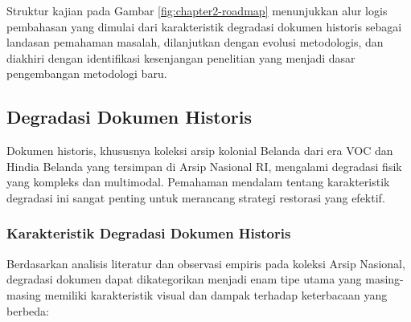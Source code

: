 \documentclass[12pt,a4paper]{article}
\begin{document}
Struktur kajian pada Gambar \ref{fig:chapter2-roadmap} menunjukkan alur logis pembahasan yang dimulai dari karakteristik degradasi dokumen historis sebagai landasan pemahaman masalah, dilanjutkan dengan evolusi metodologis, dan diakhiri dengan identifikasi kesenjangan penelitian yang menjadi dasar pengembangan metodologi baru.

\subsection{Degradasi Dokumen Historis}
\label{subsec:degradasi-dokumen}

Dokumen historis, khususnya koleksi arsip kolonial Belanda dari era VOC dan Hindia Belanda yang tersimpan di Arsip Nasional RI, mengalami degradasi fisik yang kompleks dan multimodal. Pemahaman mendalam tentang karakteristik degradasi ini sangat penting untuk merancang strategi restorasi yang efektif.

\subsubsection{Karakteristik Degradasi Dokumen Historis}
\label{subsubsec:karakteristik-degradasi}

Berdasarkan analisis literatur dan observasi empiris pada koleksi Arsip Nasional, degradasi dokumen dapat dikategorikan menjadi enam tipe utama yang masing-masing memiliki karakteristik visual dan dampak terhadap keterbacaan yang berbeda:
\end{document}
